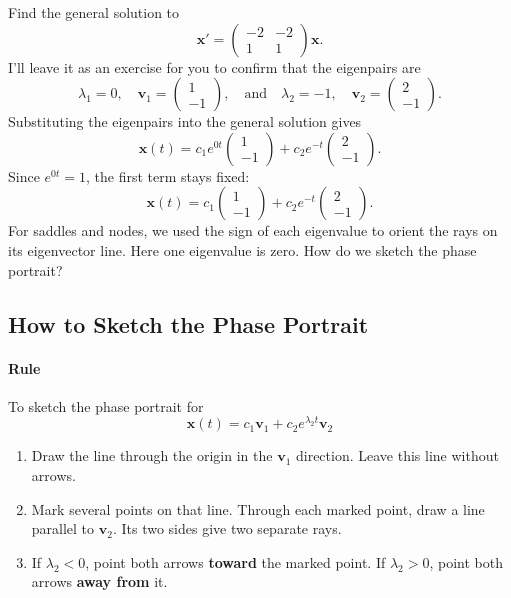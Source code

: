 \documentclass[10pt,letterpaper]{article}
\begin{document}
\begin{example}[3]{
Find the general solution to
\[
    \mathbf{x}'=
    \begin{pmatrix}-2&-2\\1&1\end{pmatrix}\mathbf{x}.
\]
}
I'll leave it as an exercise for you to confirm that the eigenpairs are
\[
    \lambda_1=0,\quad \mathbf{v}_1=\begin{pmatrix}1\\-1\end{pmatrix},
    \quad \text{and}\quad 
    \lambda_2=-1,\quad \mathbf{v}_2=\begin{pmatrix}2\\-1\end{pmatrix}.
\]
Substituting the eigenpairs into the general solution gives
\[
    \mathbf{x}(t)
    =c_1e^{0t}\begin{pmatrix}1\\-1\end{pmatrix}
     +c_2e^{-t}\begin{pmatrix}2\\-1\end{pmatrix}.
\]
Since $e^{0t}=1$, the first term stays fixed:
\[
    \boxed{\mathbf{x}(t)
    =c_1\begin{pmatrix}1\\-1\end{pmatrix}
     +c_2e^{-t}\begin{pmatrix}2\\-1\end{pmatrix}.}
\]
For saddles and nodes, we used the sign of each eigenvalue to orient
the rays on its eigenvector line. Here one eigenvalue is zero.
How do we sketch the phase portrait?
\end{example}


\subsection{How to Sketch the Phase Portrait}

\paragraph{Rule}
To sketch the phase portrait for
$$
\mathbf{x}(t)
    =c_1\textbf{v}_1
     +c_2e^{\lambda_2 t}\textbf{v}_2
$$
\begin{enumerate}
    \item Draw the line through the origin in the $\mathbf{v}_1$
    direction. Leave this line without arrows.
    \item Mark several points on that line. Through each marked point,
    draw a line parallel to $\mathbf{v}_2$. Its two sides give two
    separate rays.
    \item If $\lambda_2<0$, point both arrows \textbf{toward} the marked
    point. If $\lambda_2>0$, point both arrows \textbf{away from} it.
\end{enumerate}
\end{document}
